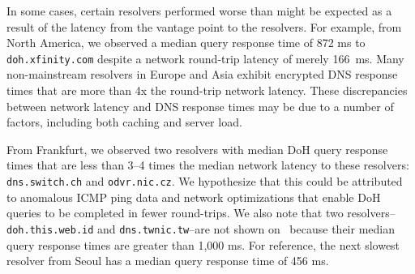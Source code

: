 In some cases, certain resolvers performed worse than might
be expected as a result of the latency from the vantage point to the
resolvers. 
For example, from North America, we
observed a median query response time of 872 ms to \texttt{doh.xfinity.com} 
despite a network round-trip latency of merely 166~ms.
Many non-mainstream resolvers in Europe and Asia exhibit encrypted DNS
response times that are more than 4x the round-trip network latency.
These discrepancies between network latency and DNS response times may be due 
to a number of factors, including both caching and server load.

From Frankfurt, we observed two resolvers with median DoH query response
times that are less than 3--4 times the median network latency to these resolvers:
\texttt{dns.switch.ch} and \texttt{odvr.nic.cz}.
We hypothesize that this could be attributed to anomalous ICMP ping data and
network optimizations that enable DoH queries to be completed in fewer
round-trips.
We also note that two resolvers--\texttt{doh.this.web.id} and
\texttt{dns.twnic.tw}--are not shown on~
because their median query response times are greater than 1,000 ms.
For reference, the next slowest resolver from Seoul has a median query response
time of 456 ms.

